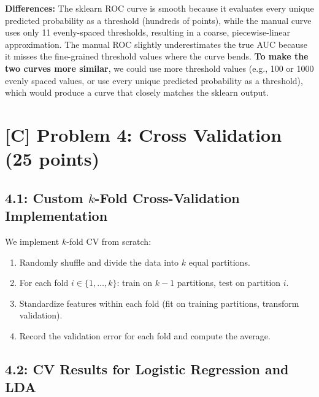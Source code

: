 \documentclass[11pt]{article}
\begin{document}
\textbf{Differences:} The sklearn ROC curve is smooth because it evaluates every unique predicted probability as a threshold (hundreds of points), while the manual curve uses only 11 evenly-spaced thresholds, resulting in a coarse, piecewise-linear approximation. The manual ROC slightly underestimates the true AUC because it misses the fine-grained threshold values where the curve bends. \textbf{To make the two curves more similar}, we could use more threshold values (e.g., 100 or 1000 evenly spaced values, or use every unique predicted probability as a threshold), which would produce a curve that closely matches the sklearn output.

\section*{[C] Problem 4: Cross Validation (25 points)}

\subsection*{4.1: Custom $k$-Fold Cross-Validation Implementation}

We implement $k$-fold CV from scratch:
\begin{enumerate}
    \item Randomly shuffle and divide the data into $k$ equal partitions.
    \item For each fold $i \in \{1, \ldots, k\}$: train on $k-1$ partitions, test on partition $i$.
    \item Standardize features within each fold (fit on training partitions, transform validation).
    \item Record the validation error for each fold and compute the average.
\end{enumerate}

\subsection*{4.2: CV Results for Logistic Regression and LDA}
\end{document}
